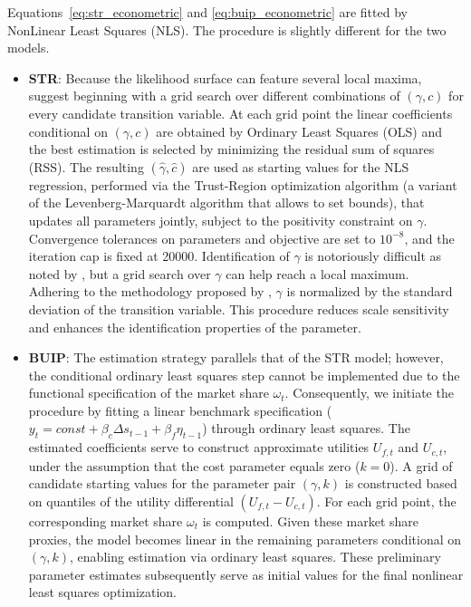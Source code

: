 \documentclass[a4paper,10pt,final]{article}    %
\begin{document}
Equations~\ref{eq:str_econometric} and \ref{eq:buip_econometric} are fitted by NonLinear Least Squares (NLS). The procedure is slightly different for the two models.
\begin{itemize}
    \item \textbf{STR}: Because the likelihood surface can feature several local maxima, \citet{GrangerTerasvirta2010} suggest beginning with a grid search over different combinations of $(\gamma,c)$ for every candidate transition variable. At each grid point the linear coefficients conditional on $(\gamma,c)$ are obtained by Ordinary Least Squares (OLS) and the best estimation is selected by minimizing the residual sum of squares (RSS). The resulting $(\hat{\gamma}, \hat{c})$ are used as starting values for the NLS regression, performed via the Trust-Region optimization algorithm (a variant of the Levenberg-Marquardt algorithm that allows to set bounds), that updates all parameters jointly, subject to the positivity constraint on $\gamma$. Convergence tolerances on parameters and objective are set to $10^{-8}$, and the iteration cap is fixed at 20000. Identification of $\gamma$ is notoriously difficult as noted by \citep{GrangerTerasvirta2010}, but a grid search over $\gamma$ can help reach a local maximum. Adhering to the methodology proposed by \citet{GrangerTerasvirta2010}, $\gamma$ is normalized by the standard deviation of the transition variable. This procedure reduces scale sensitivity and enhances the identification properties of the parameter.
    \item \textbf{BUIP}: The estimation strategy parallels that of the STR model; however, the conditional ordinary least squares step cannot be implemented due to the functional specification of the market share $\omega_t$. Consequently, we initiate the procedure by fitting a linear benchmark specification ($y_t = const + \beta_c \Delta s_{t-1} + \beta_f \eta_{t-1}$) through ordinary least squares. The estimated coefficients serve to construct approximate utilities $U_{f,t}$ and $U_{c,t}$, under the assumption that the cost parameter equals zero ($k=0$). A grid of candidate starting values for the parameter pair $(\gamma,k)$ is constructed based on quantiles of the utility differential $(U_{f,t}-U_{c,t})$. For each grid point, the corresponding market share $\omega_t$ is computed. Given these market share proxies, the model becomes linear in the remaining parameters conditional on $(\gamma,k)$, enabling estimation via ordinary least squares. These preliminary parameter estimates subsequently serve as initial values for the final nonlinear least squares optimization.
\end{itemize}
\end{document}
